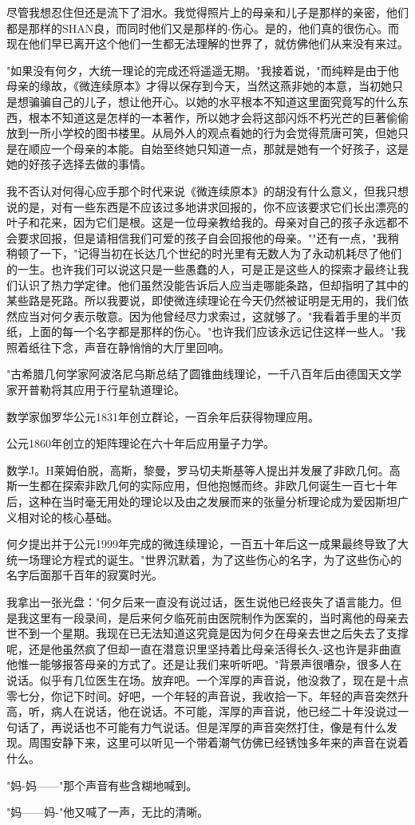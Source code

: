 \documentclass[UTF8]{ctexart}
\begin{document}
尽管我想忍住但还是流下了泪水。我觉得照片上的母亲和儿子是那样的亲密，他们都是那样的SHAN良，而同时他们又是那样的-伤心。是的，他们真的很伤心。而现在他们早已离开这个他们一生都无法理解的世界了，就仿佛他们从来没有来过。

"如果没有何夕，大统一理论的完成还将遥遥无期。"我接着说，"而纯粹是由于他母亲的缘故，《微连续原本》才得以保存到今天，当然这燕非她的本意，当初她只是想骗骗自己的儿子，想让他开心。以她的水平根本不知道这里面究竟写的什么东西，根本不知道这是怎样的一本著作，所以她才会将这部闪烁不朽光芒的巨著偷偷放到一所小学校的图书楼里。从局外人的观点看她的行为会觉得荒唐可笑，但她只是在顺应一个母亲的本能。自始至终她只知道一点，那就是她有一个好孩子，这是她的好孩子选择去做的事情。

我不否认对何得心应手那个时代来说《微连续原本》的胡没有什么意义，但我只想说的是，对有一些东西是不应该过多地讲求回报的，你不应该要求它们长出漂亮的叶子和花来，因为它们是根。这是一位母亲教给我的。母亲对自己的孩子永远都不会要求回报，但是请相信我们可爱的孩子自会回报他的母亲。""还有一点，"我稍稍顿了一下，"记得当初在长达几个世纪的时光里有无数人为了永动机耗尽了他们的一生。也许我们可以说这只是一些愚蠢的人，可是正是这些人的探索才最终让我们认识了热力学定律。他们虽然没能告诉后人应当走哪能条路，但却指明了其中的某些路是死路。所以我要说，即使微连续理论在今天仍然被证明是无用的，我们依然应当对何夕表示敬意。因为他曾经尽力求索过，这就够了。"我看着手里的半页纸，上面的每一个名字都是那样的伤心。"也许我们应该永远记住这样一些人。"我照着纸往下念，声音在静悄悄的大厅里回响。

"古希腊几何学家阿波洛尼乌斯总结了圆锥曲线理论，一千八百年后由德国天文学家开普勒将其应用于行星轨道理论。

数学家伽罗华公元1831年创立群论，一百余年后获得物理应用。

公元1860年创立的矩阵理论在六十年后应用量子力学。

数学J。H莱姆伯脱，高斯，黎曼，罗马切夫斯基等人提出并发展了非欧几何。高斯一生都在探索非欧几何的实际应用，但他抱憾而终。非欧几何诞生一百七十年后，这种在当时毫无用处的理论以及由之发展而来的张量分析理论成为爱因斯坦广义相对论的核心基础。

何夕提出并于公元1999年完成的微连续理论，一百五十年后这一成果最终导致了大统一场理论方程式的诞生。"世界沉默着，为了这些伤心的名字，为了这些伤心的名字后面那千百年的寂寞时光。

我拿出一张光盘："何夕后来一直没有说过话，医生说他已经丧失了语言能力。但是我这里有一段录间，是后来何夕临死前由医院制作为医案的，当时离他的母亲去世不到一个星期。我现在已无法知道这究竟是因为何夕在母亲去世之后失去了支撑呢，还是他虽然疯了但却一直在潜意识里坚持着比母亲活得长久-这也许是非曲直他惟一能够报答母亲的方式了。还是让我们来听听吧。"背景声很嘈杂，很多人在说话。似乎有几位医生在场。放弃吧。一个浑厚的声音说，他没救了，现在是十点零七分，你记下时间。好吧，一个年轻的声音说，我收拾一下。年轻的声音突然升高，听，病人在说话，他在说话。不可能，浑厚的声音说，他已经二十年没说过一句话了，再说话也不可能有力气说话。但是浑厚的声音突然打住，像是有什么发现。周围安静下来，这里可以听见一个带着潮气仿佛已经锈蚀多年来的声音在说着什么。

"妈-妈——"那个声音有些含糊地喊到。

"妈——妈-"他又喊了一声，无比的清晰。


\clearpage
\end{document}
